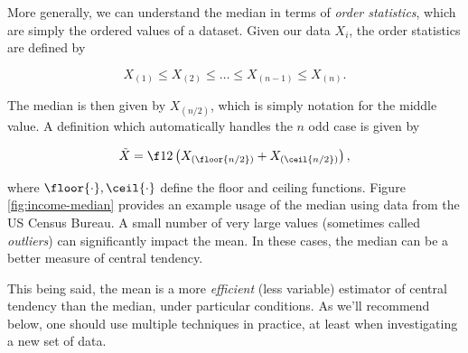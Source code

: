 \documentclass[../primer.tex]{subfiles}
\begin{document}

More generally, we can understand the median in terms of \emph{order
  statistics}, which are simply the ordered values of a dataset. Given our data
$X_i$, the order statistics are defined by

\begin{equation} \label{eq:def-order}
  X_{(1)} \leq X_{(2)} \leq \dots \leq X_{(n-1)} \leq X_{(n)}.
\end{equation}

\noindent The median is then given by $X_{(n/2)}$, which is simply notation for
the middle value. A definition which automatically handles the $n$ odd case is
given by

\begin{equation} \label{eq:def-sample-median}
  \tilde{X} = \f12\left(X_{(\floor{n/2})} + X_{(\ceil{n/2})}\right),
\end{equation}

\noindent where $\floor{\cdot}, \ceil{\cdot}$ define the floor and ceiling
functions. Figure \ref{fig:income-median} provides an example usage of the
median using data from the US Census Bureau. A small number of very large values
(sometimes called \emph{outliers}) can significantly impact the mean. In these
cases, the median can be a better measure of central tendency.

This being said, the mean is a more \emph{efficient} (less variable) estimator
of central tendency than the median, under particular
conditions.\cite{mosteller1977data} As we'll recommend below, one should use
multiple techniques in practice, at least when investigating a new set of data.
\end{document}
